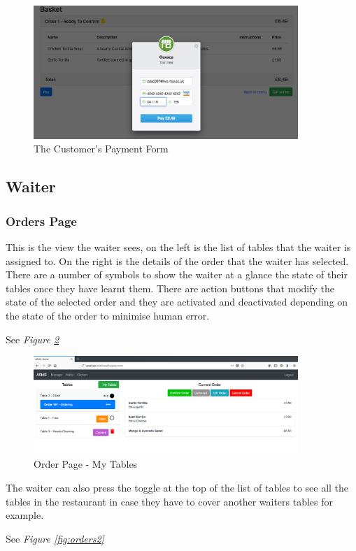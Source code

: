 \documentclass[12pt, twoside, a4paper]{report}
\begin{document}
\begin{figure}[H]
  \centering
  \includegraphics[width=10cm]{Payment.png}
  \caption{The Customer's Payment Form}
  \label{fig:pay}
\end{figure}

\subsection*{Waiter}
\subsubsection*{Orders Page}
This is the view the waiter sees, on the left is the list of tables that the waiter is assigned to.
On the right is the details of the order that the waiter has selected.
There are a number of symbols to show the waiter at a glance the state of their tables once they have learnt them.
There are action buttons that modify the state of the selected order and they are activated and deactivated depending on the state of the order to minimise human error.

See \textit{Figure \ref{fig:orders1}}

\begin{figure}[H]
  \centering
  \includegraphics[width=10cm]{orders1.png}
  \caption{Order Page - My Tables}
  \label{fig:orders1}
\end{figure}

The waiter can also press the toggle at the top of the list of tables to see all the tables in the restaurant in case they have to cover another waiters tables for example.

See \textit{Figure \ref{fig:orders2}}
\end{document}
